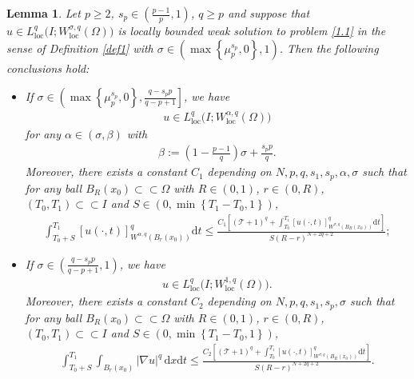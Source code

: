 \documentclass[reqno,10pt]{amsart}
\numberwithin{equation}{section}
\newtheorem{lemma}[theorem]{Lemma}
\begin{document}
\begin{lemma}
	\label{lem12}
	Let $p\ge2$, $s_p\in\left( \frac{p-1}{p},1\right)$, $q\ge p$ and suppose that $u\in L^q_{\mathrm{loc}}\bigl(I;W^{\sigma,q}_{\mathrm{loc}}(\Omega)\bigl)$ is locally bounded weak solution to problem \eqref{1.1} in the sense of Definition \ref{def1} with $\sigma\in\left(\max\left\lbrace\mu^{s_p}_p,0\right\rbrace,1  \right) $. Then the following conclusions hold:
	\begin{itemize}
		\item[(i)] If $\sigma\in \left(\max\left\lbrace\mu^{s_p}_p,0\right\rbrace,\frac{q-s_pp}{q-p+1}\right]$, we have
		\begin{align*}
			u\in L^q_{\mathrm{loc}}\bigl(I;W^{\alpha,q}_{\mathrm{loc}}(\Omega)\bigl)
		\end{align*}
		for any $\alpha\in(\sigma,\beta)$ with
		\begin{align*}
			\beta:=\left(1-\frac{p-1}{q}\right)\sigma+\frac{s_pp}{q}. 
		\end{align*}
		Moreover, there exists a constant $C_1$ depending on $N,p,q,s_1,s_p,\alpha,\sigma$ such that for any ball $B_R(x_0)\subset\subset\Omega$ with $R\in(0,1)$, $r\in (0,R)$, $(T_0,T_1)\subset\subset I$ and $S\in \left( 0,\min\left\lbrace T_1-T_0,1\right\rbrace \right) $,
		\begin{align*}
			\int_{T_0+S}^{T_1}[u(\cdot,t)]^q_{W^{\alpha,q}\left( B_r(x_0)\right)}\mathrm{d}t\le\frac{C_1\left[\left(\mathcal{T}+1\right)^q+\int_{T_0}^{T_1}[u(\cdot,t)]^q_{W^{\sigma,q}\left( B_R(x_0)\right)}\mathrm{d}t\right]}{S(R-r)^{N+2q+2}};
		\end{align*}
		\item[(ii)] If $\sigma\in\left(\frac{q-s_pp}{q-p+1},1\right)$, we have
		\begin{align*}
			u\in L^q_{\mathrm{loc}}\bigl(I;W^{1,q}_{\mathrm{loc}}(\Omega)\bigl).
		\end{align*}
		Moreover, there exists a constant $C_2$ depending on $N,p,q,s_1,s_p,\sigma$ such that for any ball $B_R(x_0)\subset\subset\Omega$ with $R\in(0,1)$, $r\in (0,R)$, $(T_0,T_1)\subset\subset I$ and $S\in \left( 0,\min\left\lbrace T_1-T_0,1\right\rbrace \right) $,
		\begin{align*}
			\int_{T_0+S}^{T_1}\int_{B_r(x_0)}|\nabla u|^q\,\mathrm{d}x\mathrm{d}t\le\frac{C_2\left[\left(\mathcal{T}+1\right)^q+\int_{T_0}^{T_1}[u(\cdot,t)]^q_{W^{\sigma,q}\left( B_R(x_0)\right)}\mathrm{d}t\right]}{S(R-r)^{N+2q+2}}.
		\end{align*}
	\end{itemize}
\end{lemma}
\end{document}
